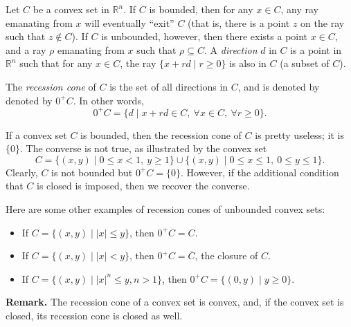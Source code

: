 \documentclass[12pt]{article}
\begin{document}
Let $C$ be a convex set in $\mathbb{R}^n$.   If $C$ is bounded, then for any $x\in C$, any ray emanating from $x$ will eventually ``exit'' $C$ (that is, there is a point $z$ on the ray such that $z\notin C$).  If $C$ is unbounded, however, then there exists a point $x\in C$, and a ray $\rho$ emanating from $x$ such that $\rho\subseteq C$.  A \emph{direction} $d$ in $C$ is a point in $\mathbb{R}^n$ such that for any $x\in C$, the ray $\lbrace x+rd\mid r\ge 0\rbrace$ is also in $C$ (a subset of $C$).

The \emph{recession cone} of $C$ is the set of all directions in $C$, and is denoted by denoted by $0^{+}C$.  In other words,
$$0^{+}C=\lbrace d\mid x+rd\in C,\ \forall x\in C,\ \forall r\ge 0\rbrace.$$

If a convex set $C$ is bounded, then the recession cone of $C$ is pretty useless; it is $\lbrace 0\rbrace$.  The converse is not true, as illustrated by the convex set 
$$C=\lbrace (x,y)\mid 0\le x< 1,\ y \ge 1\rbrace \cup \lbrace (x,y)\mid 0\le x\le 1,\ 0\le y\le 1\rbrace.$$  Clearly, $C$ is not bounded but $0^{+}C=\lbrace 0\rbrace$.  However, if the additional condition that $C$ is closed is imposed, then we recover the converse.

Here are some other examples of recession cones of unbounded convex sets:
\begin{itemize}
\item If $C=\lbrace (x,y)\mid |x| \le y\rbrace$, then $0^{+}C=C$.
\item If $C=\lbrace (x,y)\mid |x| < y\rbrace$, then $0^{+}C=\overline{C}$, the closure of $C$.
\item If $C=\lbrace (x,y)\mid |x|^{n}\le y, n>1\rbrace$, then $0^{+}C=\lbrace (0,y)\mid y\ge 0\rbrace$.
\end{itemize}

\textbf{Remark.}  The recession cone of a convex set is convex, and, if the convex set is closed, its recession cone is closed as well.
\end{document}
